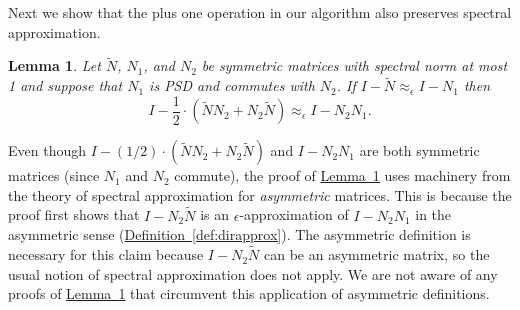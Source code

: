 \documentclass[11pt]{article}
\numberwithin{equation}{section}
\newtheorem{lemma}[theorem]{Lemma}
\theoremstyle{definition}
\theoremstyle{plain}
\newcommand{\expref}[2]{\hyperref[#2]{#1~\ref{#2}}}
\newcommand{\wt}{\widetilde}   %
\numberwithin{myalgctr}{section}
\theoremstyle{named}
\begin{document}
Next we show that the plus one operation in our algorithm also preserves spectral approximation.

\begin{lemma}
\label{lem:plusapprox}
Let $\wt{N}$, $N_1$, and $N_2$ be symmetric matrices with spectral norm at most 1 and suppose that $N_1$ is PSD and commutes with $N_2$. If $I-\wt{N}\approx_{\epsilon} I-N_1$ then 
\[
I-\frac{1}{2}\cdot (\wt{N}N_2 + N_2\wt{N})\approx_{\epsilon} I-N_2N_1.
\]
\end{lemma}

Even though $I-(1/2)\cdot (\wt{N}N_2 + N_2\wt{N})$ and $I-N_2N_1$ are both symmetric matrices (since $N_1$ and $N_2$ commute), the proof of \expref{Lemma}{lem:plusapprox} uses machinery from the theory of spectral approximation for \emph{asymmetric} matrices. This is because the proof first shows that $I-N_2\wt{N}$ is an $\epsilon$-approximation of $I-N_2N_1$ in the asymmetric sense (\expref{Definition}{def:dirapprox}). The asymmetric definition is necessary for this claim because $I-N_2\wt{N}$ can be an asymmetric matrix, so the usual notion of spectral approximation does not apply. We are not aware of any proofs of \expref{Lemma}{lem:plusapprox} that circumvent this application of asymmetric definitions. 
\end{document}

